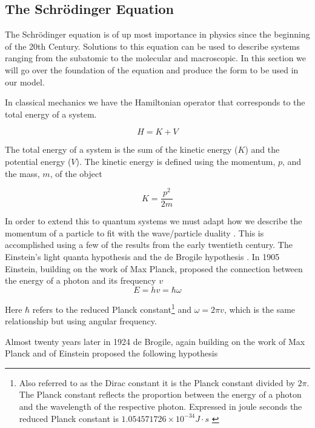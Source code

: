 \documentclass[authoryearcitations]{UoYCSproject}
\begin{document}
\subsection{The Schr\"{o}dinger Equation}
The Schr\"{o}dinger equation is of up most importance in physics since the beginning of the 20th Century. Solutions
to this equation can be used to describe systems ranging from the subatomic to the molecular and macroscopic. In this
section we will go over the foundation of the equation and produce the form to be used in our model. 

In classical mechanics we have the Hamiltonian operator that corresponds to the total
energy of a system. 

\begin{equation}
        H = K + V
\label{eq:totalEnergy}
\end{equation}

The total energy of a system is the sum of the kinetic energy ($K$) and the potential energy ($V$).
The kinetic energy is defined using the momentum, $p$, and the mass, $m$, of the object

\begin{equation}
        K = \frac{p^2}{2m}
\label{eq:K}
\end{equation}

In order to extend this to quantum systems we must adapt how we describe the momentum of a particle to
fit with the wave/particle duality \cite{qp}. This is accomplished using a few of the results from the early 
twentieth century. The Einstein's light quanta hypothesis and the de Brogile hypothesis \cite{qp, ricardo}. In 
1905 Einstein, building on the work of Max Planck,  
proposed the connection between the energy of a photon and its frequency $v$
\begin{equation}
E = hv = \hbar\omega
\label{einsteinHyp}
\end{equation}


Here $\hbar$ refers to the reduced Planck constant\footnote{Also referred to as the Dirac constant it is
the Planck constant divided by $2\pi$. The Planck constant reflects the proportion between the energy of a photon
and the wavelength of the respective photon. Expressed in joule seconds the reduced Planck constant is 
$1.054571726 \times 10^{-34} J \cdot s $ \cite{qp} } and $\omega = 2\pi v$, which is the same relationship
but using angular frequency. 

Almost twenty years later in 1924 de Brogile, again building on the work of Max Planck and of Einstein proposed
the following hypothesis
\end{document}
